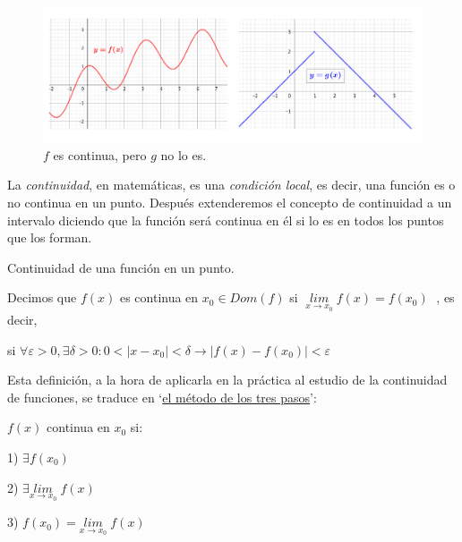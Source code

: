 		\begin{figure}[H]
			\centering
			\includegraphics[width=1\textwidth]{imagenes/imagenes03/T03IM09.png}
			\caption{$f$ es continua, pero $g$ no lo es.}
		\end{figure}
	
	La \emph{continuidad}, en matemáticas, es una \emph{condición local}, es decir, una función es o no continua en un punto. Después extenderemos el concepto de continuidad a un intervalo diciendo que la función será continua en él si lo es en todos los puntos que los forman.
	
	\begin{defi} \label{def-ctndad} Continuidad de una función en un punto.
	
	Decimos que $f(x)$ es continua en $x_0\in Dom(f)$ si $\boxed{ \; \underset{x\to x_0}{lim}\;{f(x)}=f(x_0)\; }$ , es decir, 
	
	si $\forall \varepsilon>0, \exists \delta>0: 0<|x-x_0|<\delta \to |f(x)-f(x_0)|<\varepsilon$
		
	\end{defi}

	Esta definición, a la hora de aplicarla en la práctica al estudio de la continuidad de funciones, se traduce en `\underline{el método de los tres pasos}':
	
	$f(x)$ continua en $x_0$ si:
	
	\hspace{10mm} 1) $\exists f(x_0)$

	\hspace{10mm} 2) $\exists \underset{x\to x_0}{lim}\;{f(x)}$	
	
	\hspace{10mm} 3) $f(x_0)=\underset{x\to x_0}{lim}\;{f(x)}$
	
